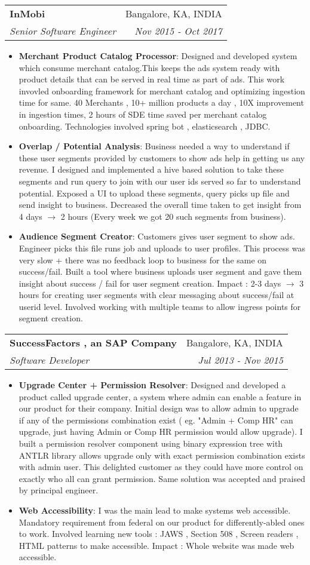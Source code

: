 \documentclass[letterpaper,11pt]{article}
\makeatletter
\newcommand{\resumeItem}[2]{
  \item\small{
    \textbf{#1}{: #2 \vspace{-2pt}}
  }
}
\newcommand{\resumeSubheading}[4]{
  \vspace{-1pt}\item
    \begin{tabular*}{0.97\textwidth}{l@{\extracolsep{\fill}}r}
      \textbf{#1} & #2 \\
      \textit{\small#3} & \textit{\small #4} \\
    \end{tabular*}\vspace{-5pt}
}
\newcommand{\resumeItemListStart}{\begin{itemize}}
\newcommand{\resumeItemListEnd}{\end{itemize}\vspace{-5pt}}
\makeatother
\begin{document}
    \resumeSubheading
      {InMobi}{Bangalore, KA, INDIA}
      {Senior Software Engineer}{Nov 2015 - Oct 2017}
      \resumeItemListStart
        \resumeItem{Merchant Product Catalog Processor}
          {Designed and developed system which consume merchant catalog.This keeps the ads system ready with product details that can be served in real time as part of ads. This work invovled onboarding framework for merchant catalog and optimizing ingestion time for same. 40 Merchants , 10+ million products a day , 10X improvement in ingestion times, 2 hours of SDE time saved per merchant catalog onboarding. Technologies involved spring bot , elasticsearch , JDBC.}
        \resumeItem{Overlap / Potential Analysis}
          {Business needed a way to understand if these user segments provided by customers to show ads help in getting us any revenue. I designed and implemented a hive based solution to take these segments and run query to join with our user ids served so far to understand potential. Exposed a UI to upload these segments, query picks up file and send insight to business. Decreased the overall time taken to get insight from 4 days $\rightarrow$ 2 hours (Every week we got 20 such segments from business).}
        \resumeItem{Audience Segment Creator}
          {Customers gives user segment to show ads. Engineer picks this file runs job and uploads to user profiles. This process was very slow + there was no feedback loop to business for the same on success/fail. Built a tool where business uploads user segment and gave them insight about success / fail for user segment creation. Impact : 2-3 days $\rightarrow$ 3 hours for creating user segments with clear messaging about success/fail at userid level. Involved working with multiple teams to allow ingress points for segment creation.}
      \resumeItemListEnd

    \resumeSubheading
      {SuccessFactors , an SAP Company}{Bangalore, KA, INDIA}
      {Software Developer}{Jul 2013 - Nov 2015}
      \resumeItemListStart
        \resumeItem{Upgrade Center + Permission Resolver}
          {Designed and developed a product called upgrade center, a system where admin can enable a feature in our product for their company. Initial design was to allow admin to upgrade if any of the permissions combination exist ( eg. "Admin + Comp HR" can upgrade, just having Admin or Comp HR permission would allow upgrade). I built a permission resolver component using binary expression tree with ANTLR library allows upgrade only with exact permission combination exists with admin user. This delighted customer as they could have more control on exactly who all can grant permission. Same solution was accepted and praised by principal engineer.}
        \resumeItem{Web Accessibility}
          {I was the main lead to make systems web accessible. Mandatory requirement from federal on our product for differently-abled ones to work. Involved learning new tools : JAWS , Section 508 , Screen readers , HTML patterns to make accessible. Impact : Whole website was made web accessible.}
      \resumeItemListEnd
\end{document}
